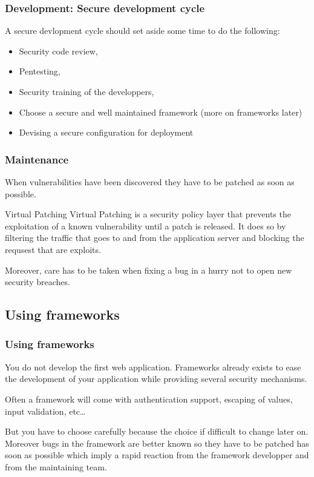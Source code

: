 \begin{frame}
\frametitle{Development: Secure development cycle}
A secure devlopment cycle should set aside some time to do the
following:
\begin{itemize}
\item Security code review,
\item Pentesting,
\item Security training of the developpers, 
\item Choose a secure and well maintained framework (more on
  frameworks later)
\item Devising a secure configuration for deployment
\end{itemize}

\end{frame}

\begin{frame}
\frametitle{Maintenance}
When vulnerabilities have been discovered they have to be patched as soon as
possible.

\begin{block}{Virtual Patching}
Virtual Patching is a security policy layer that prevents the exploitation of a known
vulnerability until a patch is released. It does so by filtering the
traffic that goes to and from the application server and blocking the
requsest that are exploits.
\end{block}

Moreover, care has to be taken when fixing a bug in a hurry not to open
new security breaches.

\end{frame}

\subsection{Using frameworks}

\begin{frame}
\frametitle{Using frameworks}

You do not develop the first web application. Frameworks already exists to
ease the development of your application while providing several security
mechanisms.

Often a framework will come with authentication support, escaping of values,
input validation, etc\ldots

But you have to choose carefully because the choice if difficult to
change later on. Moreover bugs in the framework are better known so
they have to be patched has soon as possible which imply a rapid
reaction from the framework developper and from the maintaining team.
\end{frame}

